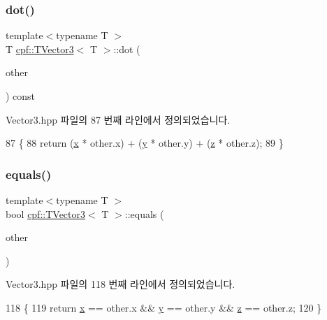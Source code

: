\subsubsection{\texorpdfstring{dot()}{dot()}}
{\footnotesize\ttfamily template$<$typename T $>$ \\
T \hyperlink{classcpf_1_1_t_vector3}{cpf\+::\+T\+Vector3}$<$ T $>$\+::dot (\begin{DoxyParamCaption}\item[{const \hyperlink{classcpf_1_1_t_vector3}{T\+Vector3}$<$ T $>$ \&}]{other }\end{DoxyParamCaption}) const\hspace{0.3cm}{\ttfamily [inline]}}



Vector3.\+hpp 파일의 87 번째 라인에서 정의되었습니다.


\begin{DoxyCode}
87                                            \{
88             \textcolor{keywordflow}{return} (\hyperlink{classcpf_1_1_t_vector3_ad3df42808358a64c518d6349ede446d8}{x} * other.x) + (\hyperlink{classcpf_1_1_t_vector3_a2371a0583e76dcc80c6f10dd168cde1b}{y} * other.y) + (\hyperlink{classcpf_1_1_t_vector3_ae7ea5f4b24c3438a44eb6b0fdfe02823}{z} * other.z);
89         \}
\end{DoxyCode}
\mbox{\label{classcpf_1_1_t_vector3_a5d7d5c83ddd27c171249c21242da7889}} 
\subsubsection{\texorpdfstring{equals()}{equals()}}
{\footnotesize\ttfamily template$<$typename T $>$ \\
bool \hyperlink{classcpf_1_1_t_vector3}{cpf\+::\+T\+Vector3}$<$ T $>$\+::equals (\begin{DoxyParamCaption}\item[{const \hyperlink{classcpf_1_1_t_vector3}{T\+Vector3}$<$ T $>$ \&}]{other }\end{DoxyParamCaption})\hspace{0.3cm}{\ttfamily [inline]}}



Vector3.\+hpp 파일의 118 번째 라인에서 정의되었습니다.


\begin{DoxyCode}
118                                            \{
119             \textcolor{keywordflow}{return} \hyperlink{classcpf_1_1_t_vector3_ad3df42808358a64c518d6349ede446d8}{x} == other.x && \hyperlink{classcpf_1_1_t_vector3_a2371a0583e76dcc80c6f10dd168cde1b}{y} == other.y && \hyperlink{classcpf_1_1_t_vector3_ae7ea5f4b24c3438a44eb6b0fdfe02823}{z} == other.z;
120         \}
\end{DoxyCode}
\mbox{\label{classcpf_1_1_t_vector3_a3fa09a4a9ce8617239cbc2bbcc9858e0}} 
